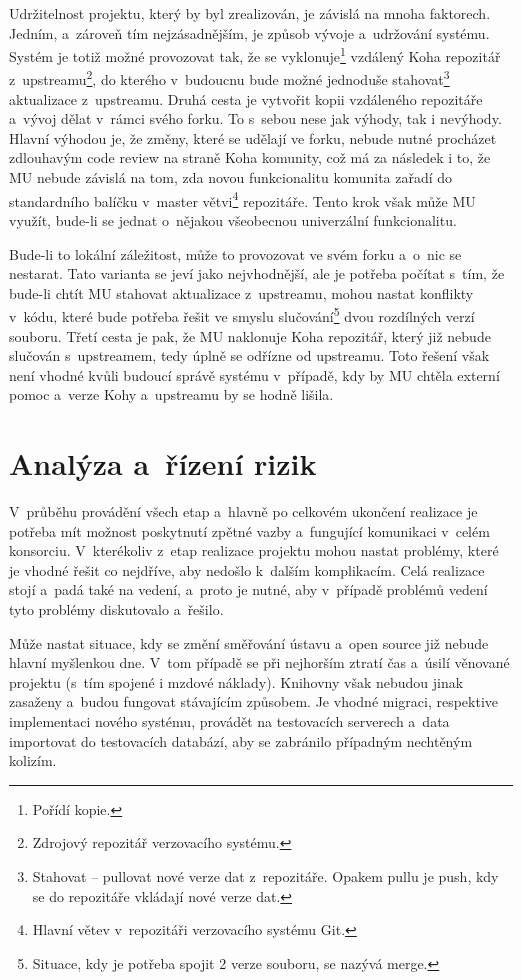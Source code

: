 \documentclass[
	11pt, oneside, printed, final, palatino
	microtype,
	table,   %
	lof,     %
	lot     %
]{fithesis3}
\begin{document}
{Udržitelnost projektu, který by byl zrealizován, je závislá na mnoha faktorech. Jedním, a~zároveň tím nejzásadnějším, je způsob vývoje a~udržování systému. Systém je totiž možné provozovat tak, že se vyklonuje\footnote{Pořídí kopie.} vzdálený Koha repozitář z~upstreamu\footnote{Zdrojový repozitář verzovacího systému.}, do kterého v~budoucnu bude možné jednoduše stahovat\footnote{Stahovat – pullovat nové verze dat z~repozitáře. Opakem pullu je push, kdy se do repozitáře vkládají nové verze dat.} aktualizace z~upstreamu. Druhá cesta je vytvořit kopii vzdáleného repozitáře a~vývoj dělat v~rámci svého forku. To s~sebou nese jak výhody, tak i nevýhody. Hlavní výhodou je, že změny, které se udělají ve forku, nebude nutné procházet zdlouhavým code review na straně Koha komunity, což má za následek i to, že MU nebude závislá na tom, zda novou funkcionalitu komunita zařadí do standardního balíčku v~master větvi\footnote{Hlavní větev v~repozitáři verzovacího systému Git.} repozitáře. Tento krok však může MU využít, bude-li se jednat o~nějakou všeobecnou univerzální funkcionalitu. 

Bude-li to lokální záležitost, může to provozovat ve svém forku a~o~nic se nestarat. Tato varianta se jeví jako nejvhodnější, ale je potřeba počítat s~tím, že bude-li chtít MU stahovat aktualizace z~upstreamu, mohou nastat konflikty v~kódu, které bude potřeba řešit ve smyslu slučování\footnote{Situace, kdy je potřeba spojit 2 verze souboru, se nazývá merge.} dvou rozdílných verzí souboru. Třetí cesta je pak, že MU naklonuje Koha repozitář, který již nebude slučován s~upstreamem, tedy úplně se odřízne od upstreamu. Toto řešení však není vhodné kvůli budoucí správě systému v~případě, kdy by MU chtěla externí pomoc a~verze Kohy a~upstreamu by se hodně lišila. 

\section{Analýza a~řízení rizik}
V~průběhu provádění všech etap a~hlavně po celkovém ukončení realizace je potřeba mít možnost poskytnutí zpětné vazby a~fungující komunikaci v~celém konsorciu. V~kterékoliv z~etap realizace projektu mohou nastat problémy, které je vhodné řešit co nejdříve, aby nedošlo k~dalším komplikacím. Celá realizace stojí a~padá také na vedení, a~proto je nutné, aby v~případě problémů vedení tyto problémy diskutovalo a~řešilo. 

Může nastat situace, kdy se změní směřování ústavu a~open source již nebude hlavní myšlenkou dne. V~tom případě se při nejhorším ztratí čas a~úsilí věnované projektu (s~tím spojené i mzdové náklady). Knihovny však nebudou jinak zasaženy a~budou fungovat stávajícím způsobem. Je vhodné migraci, respektive implementaci nového systému, provádět na testovacích serverech a~data importovat do testovacích databází, aby se zabránilo případným nechtěným kolizím.

}
\end{document}
